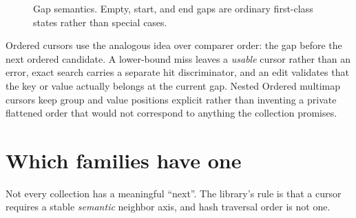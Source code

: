 \documentclass[11pt,twoside,openright]{book}
\begin{document}
\begin{figure}[htbp]
\centering
{}
\caption{Gap semantics. Empty, start, and end gaps are ordinary first-class
states rather than special cases.}
\label{fig:gap}
\end{figure}

Ordered cursors use the analogous idea over comparer order: the gap before the
next ordered candidate. A lower-bound miss leaves a \emph{usable} cursor rather
than an error, exact search carries a separate hit discriminator, and an edit
validates that the key or value actually belongs at the current gap. Nested
Ordered multimap cursors keep group and value positions explicit rather than
inventing a private flattened order that would not correspond to anything the
collection promises.

\section{Which families have one}

Not every collection has a meaningful ``next''. The library's rule is that a
cursor requires a stable \emph{semantic} neighbor axis, and hash traversal order
is not one.
\end{document}
